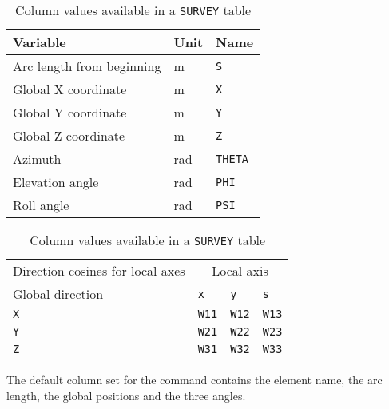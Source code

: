 \begin{table}[Ht]
  \caption{Column values available in a \texttt{SURVEY} table}
  \label{tab:survey_col}
  \begin{center}
    \begin{tabular}{|l|l|l|}
      \hline
      Variable & Unit & Name \\
      \hline
      Arc length from beginning & m & \texttt{S}\index{S} \\
      Global X coordinate & m & \texttt{X}\index{X} \\
      Global Y coordinate & m & \texttt{Y}\index{Y} \\
      Global Z coordinate  & m & \texttt{Z}\index{Z} \\
      Azimuth & rad & \texttt{THETA}\index{THETA} \\
      Elevation angle & rad & \texttt{PHI}\index{PHI} \\
      Roll angle & rad & \texttt{PSI}\index{PSI} \\
      \hline
    \end{tabular}

    \begin{tabular}{|l|l|l|l|}
      \hline
      Direction cosines for local axes & \multicolumn{3}{c|}{Local axis} \\
      Global direction & \texttt{x} & \texttt{y} & \texttt{s} \\
      \hline
      \texttt{X} & \texttt{W11}\index{W11} &
      \texttt{W12}\index{W12} & \texttt{W13}\index{W13} \\
      \texttt{Y} & \texttt{W21}\index{W21} &
      \texttt{W22}\index{W22} & \texttt{W23}\index{W23} \\
      \texttt{Z} & \texttt{W31}\index{W31} &
      \texttt{W32}\index{W32} & \texttt{W33}\index{W33} \\
      \hline
    \end{tabular}
  \end{center}
\end{table}
\clearpage
The default column set for the command
 contains the element name,
the arc length, the global positions and the three angles.

